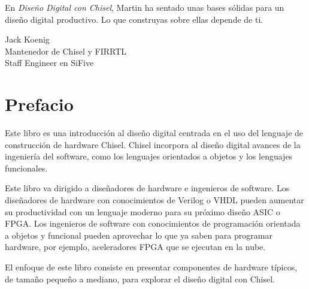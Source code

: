 \documentclass[%
    10pt,
    headinclude, footinclude=false,
    openright, %
    notitlepage,
    cleardoublepage=empty,
    headsepline,
    numbers=noenddot,
    bibliography=totoc, index=totoc,
    ]{scrbook}
\begin{document}
En \emph{Diseño Digital con Chisel}, Martin ha sentado unas bases sólidas para un diseño digital productivo. 
Lo que construyas sobre ellas depende de ti.


\medskip
\noindent Jack Koenig\\
Mantenedor de Chisel y FIRRTL\\
Staff Engineer en SiFive


\chapter{Prefacio}


Este libro es una introducción al diseño digital centrada en el uso del lenguaje de construcción de hardware Chisel. 
Chisel incorpora al diseño digital avances de la ingeniería del software, como los lenguajes orientados a objetos y 
los lenguajes funcionales.


Este libro va dirigido a diseñadores de hardware e ingenieros de software. Los diseñadores de hardware con 
conocimientos de Verilog o VHDL pueden aumentar su productividad con un lenguaje moderno para su próximo diseño ASIC o 
FPGA. Los ingenieros de software con conocimientos de programación orientada a objetos y funcional pueden aprovechar 
lo que ya saben para programar hardware, por ejemplo, aceleradores FPGA que se ejecutan en la nube.


El enfoque de este libro consiste en presentar componentes de hardware típicos, de tamaño pequeño a mediano, 
para explorar el diseño digital con Chisel.
\end{document}
